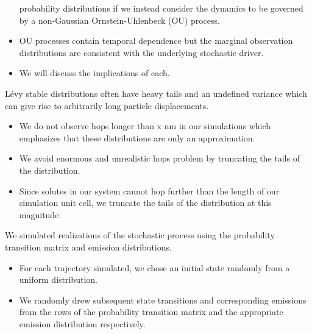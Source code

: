 \documentclass{article}
\begin{document}
\begin{itemize}
    probability distributions if we instead consider the dynamics to be governed by a
    non-Gaussian Ornstein-Uhlenbeck (OU) process.\cite{barndorffnielsen_non-gaussian_2001} %
    \item OU processes contain temporal dependence but the marginal observation distributions
    are consistent with the underlying stochastic driver.~\cite{taufer_simulation_2009}
    \item We will discuss the implications of each.  
  \end{itemize}
  
  L\'evy stable distributions often have heavy tails and an undefined variance 
  which can give rise to arbitrarily long particle displacements.
  \begin{itemize}
  	\item We do not observe hops longer than x nm in our simulations which 
  	emphasizes that these distributions are only an approximation.
    \item We avoid enormous and unrealistic hops problem by truncating the tails
    of the distribution. %
    \item Since solutes in our system cannot hop further than the length of our 
    simulation unit cell, we truncate the tails of the distribution at this
    magnitude.
  \end{itemize}
  
  We simulated realizations of the stochastic process using the probability transition
  matrix and emission distributions.
  \begin{itemize}
    \item For each trajectory simulated, we chose an initial state randomly from a 
    uniform distribution. %
    \item We randomly drew subsequent state transitions and corresponding emissions 
    from the rows of the probability transition matrix and the appropriate emission
    distribution respectively.
  \end{itemize}
  
\end{document}

